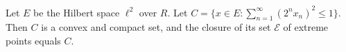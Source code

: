 Let $E$ be the Hilbert space $\ell^2$ over $R$. Let $C = \{x \in E: \sum_{n=1}^{\infty} (2^n x_n)^2 \leq 1\}$. Then $C$ is a convex and compact set, and the closure of its set $\mathcal{E}$ of extreme points equals $C$.
